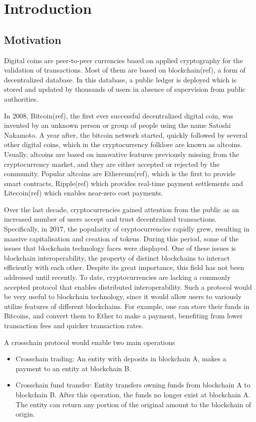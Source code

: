 \chapter{Introduction}

\section{Motivation}

Digital coins are peer-to-peer currencies based on applied cryptography
for the validation of transactions. Most of them are based on
blockchain(ref), a form of decentralized database. In this database, a
public ledger is deployed which is stored and updated by thousands of
users in absence of supervision from public authorities.

In 2008, Bitcoin(ref), the first ever successful decentralized digital
coin, was invented by an unknown person or group of people using the
name Satoshi Nakamoto. A year after, the bitcoin network started,
quickly followed by several other digital coins, which in the
cryptocurrency folklore are known as altcoins. Usually, altcoins are
based on innovative features previously missing from the cryptocurrency
market, and they are either accepted or rejected by the community.
Popular altcoins are Ethereum(ref), which is the first to provide smart
contracts, Ripple(ref) which provides real-time payment settlements and
Litecoin(ref) which enables near-zero cost payments.

Over the last decade, cryptocurrencies gained attention from the public
as an increased number of users accept and trust decentralized
transactions. Specifically, in 2017, the popularity of cryptocurrencies
rapidly grew, resulting in massive capitalisation and creation of
tokens. During this period, some of the issues that blockchain
technology faces were displayed. One of these issues is blockchain
interoperability, the property of distinct blockchains to interact
efficiently with each other. Despite its great importance, this field
has not been addressed until recently. To date, cryptocurrencies are
lacking a commonly accepted protocol that enables distributed
interoperability. Such a protocol would be very useful to blockchain
technology, since it would allow users to variously utilize features of
different blockchains. For example, one can store their funds in
Bitcoins, and convert them to Ether to make a payment, benefiting from
lower transaction fees and quicker transaction rates.

A crosschain protocol would enable two main operations
\begin{itemize}
    \item
        Crosschain trading: An entity with deposits in blockchain A, makes a
        payment to an entity at blockchain B.
    \item
        Crosschain fund transfer: Entity transfers owning funds from
        blockchain A to blockchain B. After this operation, the funds no
        longer exist at blockchain A. The entity can return any portion of the
        original amount to the blockchain of origin.
\end{itemize}

